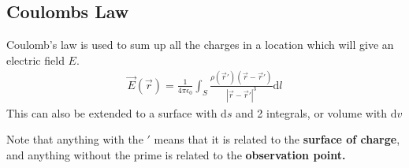 \documentclass[12pt,letterpaper]{article} \usepackage{amsmath} \usepackage{graphicx} \usepackage[margin=1in]{geometry} \usepackage{longtable}  \usepackage{amssymb}
\begin{document}
	\subsection{Coulombs Law}
	Coulomb's law is used to sum up all the charges in a location which will give an electric field $E$.
	\begin{align*}
		\vec E (\vec r) = \frac{1}{4\pi \epsilon_0} \int_S \frac{\rho(\vec r\prime)(\vec r - \vec r\prime)}{|\vec r - \vec r\prime | ^3}\mathrm d l
	\end{align*}
	This can also be extended to a surface with $\mathrm ds$ and 2 integrals, or volume with $\mathrm dv$
	
	Note that anything with the $\prime$ means that it is related to the \textbf{surface of charge}, and anything without the prime is related to the \textbf{observation point.}
	
\end{document}
